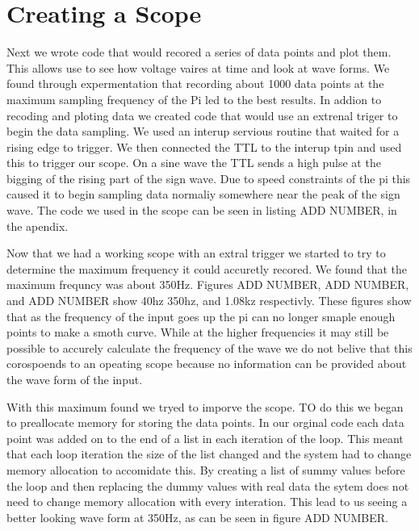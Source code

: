 \documentclass[prl,12pt,notitlepage,aps,onecolumn,superscriptaddress]{revtex4-1}
\begin{document}
\section{Creating a Scope}
Next we wrote code that would recored a series of data points and plot them. This allows use to see how voltage vaires at time and look at wave forms. We found through expermentation that recording about 1000 data points at the maximum sampling frequency of the Pi led to the best results. In addion to recoding and ploting data we created code that would use an extrenal triger to begin the data sampling. We used an interup servious routine that waited for a rising edge to trigger. We then connected the TTL to the interup tpin and used this to trigger our scope. On a sine wave the TTL sends a high pulse at the bigging of the rising part of the sign wave. Due to speed constraints of the pi this caused it to begin sampling data normaliy somewhere near the peak of the sign wave. The code we used in the scope can be seen in listing ADD NUMBER, in the apendix.

Now that we had a working scope with an extral trigger we started to try to determine the maximum frequency it could accuretly recored. We found that the maximum frequncy was about 350Hz. Figures ADD NUMBER, ADD NUMBER, and ADD NUMBER show 40hz 350hz, and 1.08kz respectivly. These figures show that as the frequency of the input goes up the pi can no longer smaple enough points to make a smoth curve. While at the higher frequencies it may still be possible to accurely calculate the frequency of the wave we do not belive that this corospoends to an opeating scope because no information can be provided about the wave form of the input.

With this maximum found we tryed to imporve the scope. TO do this we began to preallocate memory for storing the data points. In our orginal code each data point was added on to the end of a list in each iteration of the loop. This meant that each loop iteration the size of the list changed and the system had to change memory allocation to accomidate this. By creating a list of summy values before the loop and then replacing the dummy values with real data the sytem does not need to change memory allocation with every interation. This lead to us seeing a better looking wave form at 350Hz, as can be seen in figure ADD NUMBER.
\end{document}
